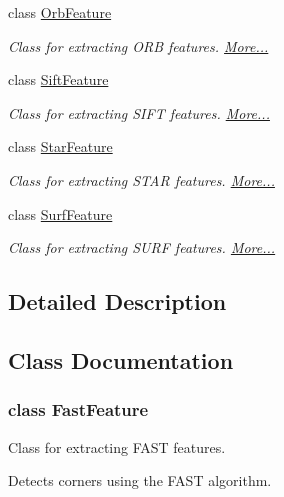 \begin{DoxyCompactItemize}
class \hyperlink{group___feature_extractor_class_orb_feature}{Orb\-Feature}
\begin{DoxyCompactList}\small\item\em Class for extracting O\-R\-B features.  \hyperlink{group___feature_extractor_class_orb_feature}{More...}\end{DoxyCompactList}\item 
class \hyperlink{group___feature_extractor_class_sift_feature}{Sift\-Feature}
\begin{DoxyCompactList}\small\item\em Class for extracting S\-I\-F\-T features.  \hyperlink{group___feature_extractor_class_sift_feature}{More...}\end{DoxyCompactList}\item 
class \hyperlink{group___feature_extractor_class_star_feature}{Star\-Feature}
\begin{DoxyCompactList}\small\item\em Class for extracting S\-T\-A\-R features.  \hyperlink{group___feature_extractor_class_star_feature}{More...}\end{DoxyCompactList}\item 
class \hyperlink{group___feature_extractor_class_surf_feature}{Surf\-Feature}
\begin{DoxyCompactList}\small\item\em Class for extracting S\-U\-R\-F features.  \hyperlink{group___feature_extractor_class_surf_feature}{More...}\end{DoxyCompactList}\end{DoxyCompactItemize}


\subsection{Detailed Description}


\subsection{Class Documentation}
\label{class_fast_feature}
\hypertarget{group___feature_extractor_class_fast_feature}{}
\subsubsection{class Fast\-Feature}
Class for extracting F\-A\-S\-T features. 

\begin{DoxyVerb}Detects corners using the FAST algorithm.
\end{DoxyVerb}


